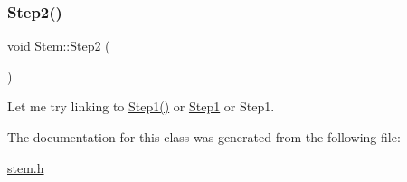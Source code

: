 \subsubsection{\texorpdfstring{Step2()}{Step2()}}
{\footnotesize\ttfamily void Stem\+::\+Step2 (\begin{DoxyParamCaption}{ }\end{DoxyParamCaption})\hspace{0.3cm}{\ttfamily [inline]}}

Let me try linking to \hyperlink{class_stem_a0664001fe76935498f49932b446d43c3}{Step1()} or \hyperlink{class_stem_a0664001fe76935498f49932b446d43c3}{Step1} or Step1. 

The documentation for this class was generated from the following file\+:\begin{DoxyCompactItemize}
\item 
\hyperlink{stem_8h}{stem.\+h}\end{DoxyCompactItemize}
